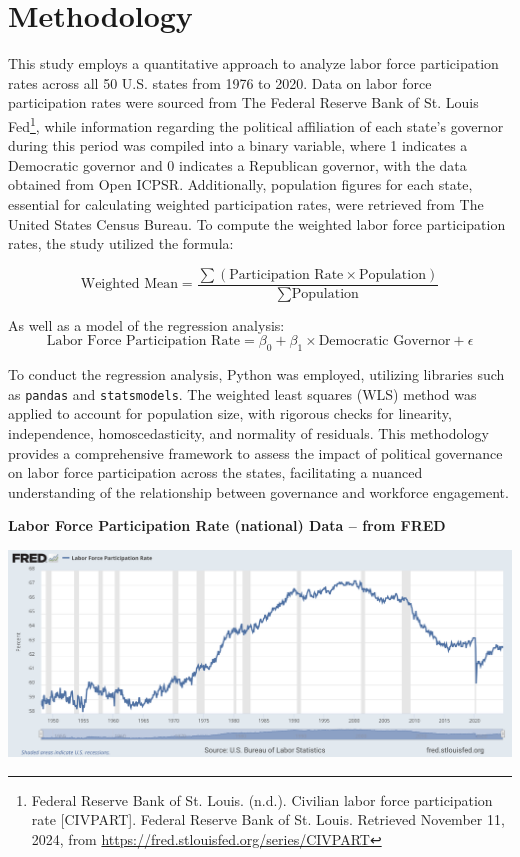\chapter{Methodology}

This study employs a quantitative approach to analyze labor force participation rates across all 50 U.S. states from 1976 to 2020. Data on labor force participation rates were sourced from The Federal Reserve Bank of St. Louis Fed\footnote{Federal Reserve Bank of St. Louis. (n.d.). Civilian labor force participation rate [CIVPART]. Federal Reserve Bank of St. Louis. Retrieved November 11, 2024, from \href{https://fred.stlouisfed.org/series/CIVPART}{https://fred.stlouisfed.org/series/CIVPART}}, while information regarding the political affiliation of each state's governor during this period was compiled into a binary variable, where 1 indicates a Democratic governor and 0 indicates a Republican governor, with the data obtained from Open ICPSR. Additionally, population figures for each state, essential for calculating weighted participation rates, were retrieved from The United States Census Bureau. To compute the weighted labor force participation rates, the study utilized the formula:

\begin{equation}
\text{Weighted Mean} = \frac{\sum (\text{Participation Rate} \times \text{Population})}{\sum \text{Population}}
\end{equation}

As well as a model of the regression analysis:
\begin{equation}

\text{Labor Force Participation Rate} = \beta_0 + \beta_1 \times \text{Democratic Governor} + \epsilon
\end{equation}

To conduct the regression analysis, Python was employed, utilizing libraries such as \texttt{pandas} and \texttt{statsmodels}. The weighted least squares (WLS) method was applied to account for population size, with rigorous checks for linearity, independence, homoscedasticity, and normality of residuals. This methodology provides a comprehensive framework to assess the impact of political governance on labor force participation across the states, facilitating a nuanced understanding of the relationship between governance and workforce engagement.

\textbf{Labor Force Participation Rate (national) Data -- from FRED}

\includegraphics[width=0.7\linewidth]{files/FRED-b4c4bb880b38d58a7677f8cacc531c46.png}

